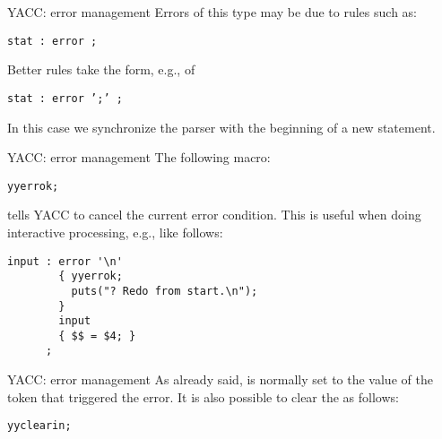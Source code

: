 \begin{frame}[fragile]{YACC: error management}
Errors of this type may be due to rules such as:
\begin{center}\tt stat : error ;\end{center}


\vspace{20pt}

Better rules take the form, e.g., of 
\begin{center}\tt stat : error ';' ;\end{center}


\vspace{20pt}

In this case we synchronize the parser with the beginning
of a new statement.



\end{frame}
\begin{frame}[fragile]{YACC: error management}
The following macro:


\vspace{20pt}

\begin{center}{\tt yyerrok;}\end{center}


\vspace{20pt}

tells YACC to cancel the current error condition.
This is useful when doing interactive processing, e.g., like
follows:


\vspace{20pt}

\begin{verbatim}
input : error '\n'
        { yyerrok;
          puts("? Redo from start.\n");
        } 
        input
        { $$ = $4; }
      ;
\end{verbatim}


\end{frame}
\begin{frame}[fragile]{YACC: error management}
As already said, \lat{} is normally set to the value of the
token that triggered the error. It is also possible to
clear the \lat{} as follows:


\vspace{20pt}

\begin{center}\tt yyclearin;\end{center}




\end{frame}
